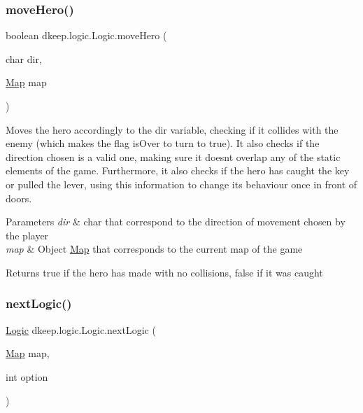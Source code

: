 \subsubsection{\texorpdfstring{move\+Hero()}{moveHero()}}
{\footnotesize\ttfamily boolean dkeep.\+logic.\+Logic.\+move\+Hero (\begin{DoxyParamCaption}\item[{char}]{dir,  }\item[{\hyperlink{classdkeep_1_1logic_1_1_map}{Map}}]{map }\end{DoxyParamCaption})}

Moves the hero accordingly to the dir variable, checking if it collides with the enemy (which makes the flag is\+Over to turn to true). It also checks if the direction chosen is a valid one, making sure it doesn\textquotesingle{}t overlap any of the static elements of the game. Furthermore, it also checks if the hero has caught the key or pulled the lever, using this information to change it\textquotesingle{}s behaviour once in front of doors. 
\begin{DoxyParams}{Parameters}
{\em dir} & char that correspond to the direction of movement chosen by the player \\
\hline
{\em map} & Object \hyperlink{classdkeep_1_1logic_1_1_map}{Map} that corresponds to the current map of the game \\
\hline
\end{DoxyParams}
\begin{DoxyReturn}{Returns}
true if the hero has made with no collisions, false if it was caught 
\end{DoxyReturn}
\mbox{\label{classdkeep_1_1logic_1_1_logic_a2f6e65021a7b525a5c61ebe1a56f09db}} 
\subsubsection{\texorpdfstring{next\+Logic()}{nextLogic()}}
{\footnotesize\ttfamily \hyperlink{classdkeep_1_1logic_1_1_logic}{Logic} dkeep.\+logic.\+Logic.\+next\+Logic (\begin{DoxyParamCaption}\item[{\hyperlink{classdkeep_1_1logic_1_1_map}{Map}}]{map,  }\item[{int}]{option }\end{DoxyParamCaption})}

